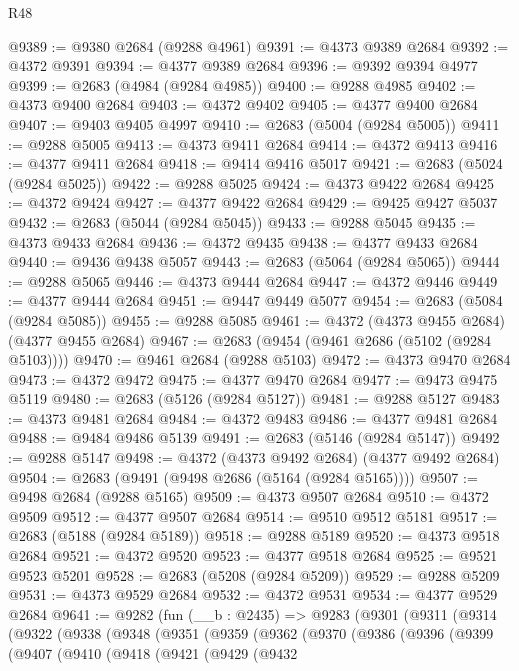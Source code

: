 \begin{lexlean}{R48}
\begin{coremodule}
@9389 := @9380 @2684 (@9288 @4961)
@9391 := @4373 @9389 @2684
@9392 := @4372 @9391
@9394 := @4377 @9389 @2684
@9396 := @9392 @9394 @4977
@9399 := @2683 (@4984 (@9284 @4985))
@9400 := @9288 @4985
@9402 := @4373 @9400 @2684
@9403 := @4372 @9402
@9405 := @4377 @9400 @2684
@9407 := @9403 @9405 @4997
@9410 := @2683 (@5004 (@9284 @5005))
@9411 := @9288 @5005
@9413 := @4373 @9411 @2684
@9414 := @4372 @9413
@9416 := @4377 @9411 @2684
@9418 := @9414 @9416 @5017
@9421 := @2683 (@5024 (@9284 @5025))
@9422 := @9288 @5025
@9424 := @4373 @9422 @2684
@9425 := @4372 @9424
@9427 := @4377 @9422 @2684
@9429 := @9425 @9427 @5037
@9432 := @2683 (@5044 (@9284 @5045))
@9433 := @9288 @5045
@9435 := @4373 @9433 @2684
@9436 := @4372 @9435
@9438 := @4377 @9433 @2684
@9440 := @9436 @9438 @5057
@9443 := @2683 (@5064 (@9284 @5065))
@9444 := @9288 @5065
@9446 := @4373 @9444 @2684
@9447 := @4372 @9446
@9449 := @4377 @9444 @2684
@9451 := @9447 @9449 @5077
@9454 := @2683 (@5084 (@9284 @5085))
@9455 := @9288 @5085
@9461 := @4372 (@4373 @9455 @2684) (@4377 @9455 @2684)
@9467 := @2683 (@9454 (@9461 @2686 (@5102 (@9284 @5103))))
@9470 := @9461 @2684 (@9288 @5103)
@9472 := @4373 @9470 @2684
@9473 := @4372 @9472
@9475 := @4377 @9470 @2684
@9477 := @9473 @9475 @5119
@9480 := @2683 (@5126 (@9284 @5127))
@9481 := @9288 @5127
@9483 := @4373 @9481 @2684
@9484 := @4372 @9483
@9486 := @4377 @9481 @2684
@9488 := @9484 @9486 @5139
@9491 := @2683 (@5146 (@9284 @5147))
@9492 := @9288 @5147
@9498 := @4372 (@4373 @9492 @2684) (@4377 @9492 @2684)
@9504 := @2683 (@9491 (@9498 @2686 (@5164 (@9284 @5165))))
@9507 := @9498 @2684 (@9288 @5165)
@9509 := @4373 @9507 @2684
@9510 := @4372 @9509
@9512 := @4377 @9507 @2684
@9514 := @9510 @9512 @5181
@9517 := @2683 (@5188 (@9284 @5189))
@9518 := @9288 @5189
@9520 := @4373 @9518 @2684
@9521 := @4372 @9520
@9523 := @4377 @9518 @2684
@9525 := @9521 @9523 @5201
@9528 := @2683 (@5208 (@9284 @5209))
@9529 := @9288 @5209
@9531 := @4373 @9529 @2684
@9532 := @4372 @9531
@9534 := @4377 @9529 @2684
@9641 := @9282
    (fun (__b : @2435) =>
    @9283
      (@9301
        (@9311
          (@9314
            (@9322
              (@9338
                (@9348
                  (@9351
                    (@9359
                      (@9362
                        (@9370
                          (@9386
                            (@9396
                              (@9399
                                (@9407
                                  (@9410
                                    (@9418
                                      (@9421
                                        (@9429
                                          (@9432

\end{coremodule}
\end{lexlean}
